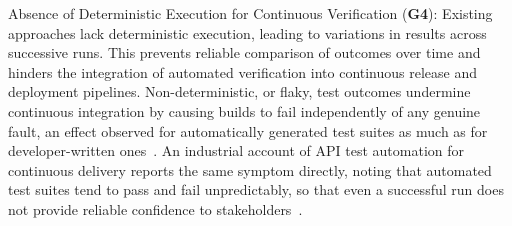Absence of Deterministic Execution for Continuous Verification (\textbf{G4}): Existing approaches lack deterministic execution, leading to variations in results across successive runs. This prevents reliable comparison of outcomes over time and hinders the integration of automated verification into continuous release and deployment pipelines.
Non-deterministic, or flaky, test outcomes undermine continuous integration by causing builds to fail independently of any genuine fault, an effect observed for automatically generated test suites as much as for developer-written ones~\cite{parrySurveyFlakyTests2021}. An industrial account of API test automation for continuous delivery reports the same symptom directly, noting that automated test suites tend to pass and fail unpredictably, so that even a successful run does not provide reliable confidence to stakeholders~\cite{bennettPracticalMethodAPI2021}.



